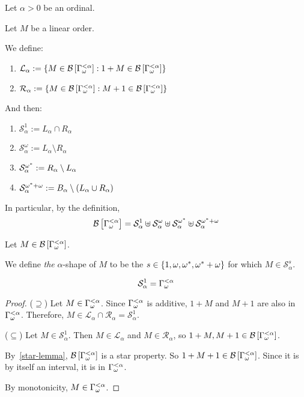 \begin{definitions}
  Let $\alpha > 0$ be an ordinal.

  Let $M$ be a linear order.

  We define:
  \begin{enumerate}
    \item $\mathcal{L}_{\alpha} := \left\{ {M \in \mathcal{B} \left[ {{\Gamma_{\omega}^{< \alpha}}} \right] : 1 + M \in \mathcal{B} \left[ {{\Gamma_{\omega}^{< \alpha}}} \right]} \right\}$
    \item $\mathcal{R}_{\alpha} := \left\{ {M \in \mathcal{B} \left[ {{\Gamma_{\omega}^{< \alpha}}} \right] : M + 1 \in \mathcal{B} \left[ {{\Gamma_{\omega}^{< \alpha}}} \right]} \right\}$
  \end{enumerate}

  And then:
  \begin{enumerate}
    \item $\mathcal{S}^{1}_{\alpha} := L_{\alpha} \cap R_{\alpha}$
    \item $\mathcal{S}^{\omega}_{\alpha} := L_{\alpha} \setminus R_{\alpha}$
    \item $\mathcal{S}^{\omega^\ast}_{\alpha} := R_{\alpha} \setminus L_{\alpha}$
    \item $\mathcal{S}^{\omega^\ast + \omega}_{\alpha} := B_{\alpha} \setminus (L_{\alpha} \cup R_{\alpha})$
  \end{enumerate}

  In particular, by the definition,
  \[
    \mathcal{B} \left[ {{\Gamma_{\omega}^{< \alpha}}} \right]
    = \mathcal{S}^{1}_{\alpha}
    \uplus \mathcal{S}^{\omega}_{\alpha}
    \uplus \mathcal{S}^{\omega^\ast}_{\alpha}
    \uplus \mathcal{S}^{\omega^\ast + \omega}_{\alpha}
  \]

  Let $M \in \mathcal{B} \left[ {{\Gamma_{\omega}^{< \alpha}}} \right]$.
  
  We define \emph{the} $\alpha$-shape
  of $M$ to be the $s \in \left\{ {1, \omega, \omega^\ast, \omega^\ast + \omega} \right\}$
  for which $M \in \mathcal{S}^{s}_{\alpha}$.
\end{definitions}

\begin{lemma}\label{b_alpha-structure-lemma-1}
  \[
    \mathcal{S}^{1}_{\alpha} = \Gamma_{\omega}^{< \alpha}
  \]
\end{lemma}

\begin{proof}
  ($\supseteq$) Let $M \in \Gamma_{\omega}^{< \alpha}$.
  Since $\Gamma_{\omega}^{< \alpha}$ is additive, $1 + M$ and $M + 1$ are also in $\Gamma_{\omega}^{< \alpha}$.
  Therefore, $M \in \mathcal{L}_{\alpha} \cap \mathcal{R}_{\alpha}
  = \mathcal{S}^{1}_{\alpha}$.

  ($\subseteq$) Let $M \in \mathcal{S}^{1}_{\alpha}$.
  Then $M \in \mathcal{L}_{\alpha}$ and $M \in \mathcal{R}_{\alpha}$,
  so $1 + M, M + 1 \in \mathcal{B} \left[ {{\Gamma_{\omega}^{< \alpha}}} \right]$.

  By~\cref{star-lemma}, $\mathcal{B} \left[ {{\Gamma_{\omega}^{< \alpha}}} \right]$ is a star property.
  So $1 + M + 1 \in \mathcal{B} \left[ {{\Gamma_{\omega}^{< \alpha}}} \right]$. Since it is by itself
  an interval, it is in $\Gamma_{\omega}^{< \alpha}$.

  By monotonicity, $M \in \Gamma_{\omega}^{< \alpha}$.
\end{proof}

